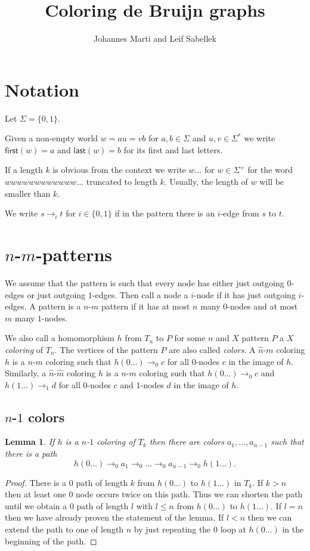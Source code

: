 \documentclass[a4paper]{article}
\title{Coloring de Bruijn graphs}
\author{Johannes Marti and Leif Sabellek}
\newcommand{\first}[1]{\mathsf{first}({#1})}
\newcommand{\last}[1]{\mathsf{last}({#1})}
\newtheorem{lemma}[theorem]{Lemma}
\begin{document}
\maketitle

\section{Notation}

Let $\Sigma = \{0,1\}$.

Given a non-empty world $w = a u = v b$ for $a,b \in \Sigma$ and $u,v
\in \Sigma^*$ we write $\first{w} = a$ and $\last{w} = b$ for its first
and last letters.

If a length $k$ is obvious from the context we write $w\dots$ for $w \in
\Sigma^+$ for the word $w w w w w w w w w w w w \dots$ truncated to
length $k$. Usually, the length of $w$ will be smaller than $k$.

We write $s \rightarrow_i t$ for $i \in \{0,1\}$ if in the pattern there
is an $i$-edge from $s$ to $t$.


\section{$n$-$m$-patterns}

We assume that the pattern is such that every node has either just
outgoing $0$-edges or just outgoing $1$-edges. Then call a node a
$i$-node if it has just outgoing $i$-edges. A pattern is a $n$-$m$
pattern if it has at most $n$ many $0$-nodes and at most $m$ many
$1$-nodes. 

We also call a homomorphism $h$ from $T_n$ to $P$ for some $n$ and $X$
pattern $P$ a \emph{$X$ coloring} of $T_n$. The vertices of the pattern
$P$ are also called \emph{colors}. A $\hat{n}$-$m$ coloring $h$ is a
$n$-$m$ coloring such that $h(0\dots) \rightarrow_0 c$ for all $0$-nodes
$c$ in the image of $h$. Similarly, a $\hat{n}$-$\hat{m}$ coloring $h$
is a $n$-$m$ coloring such that $h(0\dots) \rightarrow_0 c$ and
$h(1\dots) \rightarrow_1 d$ for all $0$-nodes $c$ and $1$-nodes $d$ in
the image of $h$.

\subsection{$n$-$1$ colors}

\begin{lemma} \label{l:path to other loop}
 If $h$ is a $n$-$1$ coloring of $T_k$ then there are colors
$a_1,\dots,a_{n - 1}$ such that there is a path
\[
 h(0\dots) \rightarrow_0 a_1 \rightarrow_0 \dots \rightarrow_0 a_{n - 1}
\rightarrow_0 h(1\dots).
\]
\end{lemma}
\begin{proof}
 There is a $0$ path of length $k$ from $h(0\dots)$ to $h(1\dots)$ in
$T_k$. If $k > n$ then at least one $0$ node occurs twice on this path.
Thus we can shorten the path until we obtain a $0$ path of length $l$
with $l \leq n$ from $h(0\dots)$ to $h(1\dots)$. If $l = n$ then we have
already proven the statement of the lemma. If $l < n$ then we can extend
the path to one of length $n$ by just repeating the $0$ loop at
$h(0\dots)$ in the beginning of the path.
\end{proof}
\end{document}
